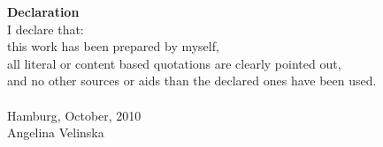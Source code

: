 \pagebreak\par
{\Large\noindent \textbf{Declaration}}\\

\noindent I declare that:\\
this work has been prepared by myself,\\
all literal or content based quotations are clearly pointed out,\\
and no other sources or aids than the declared ones have been used.\\
\vspace{3cm}\\
Hamburg, October, 2010 \\
Angelina Velinska
\pagebreak 

